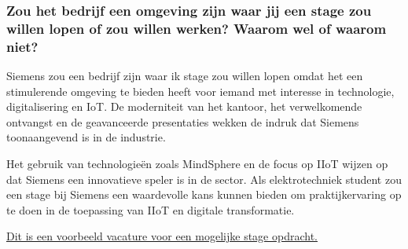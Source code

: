 \subsubsection{Zou het bedrijf een omgeving zijn waar jij een stage zou willen lopen of zou willen werken? Waarom wel of waarom niet?}

Siemens zou een bedrijf zijn waar ik stage zou willen lopen omdat het een stimulerende omgeving te bieden heeft voor iemand met interesse in technologie, digitalisering en IoT. De moderniteit van het kantoor, het verwelkomende ontvangst en de geavanceerde presentaties wekken de indruk dat Siemens toonaangevend is in de industrie.

Het gebruik van technologieën zoals MindSphere en de focus op IIoT wijzen op dat Siemens een innovatieve speler is in de sector. Als elektrotechniek student zou een stage bij Siemens een waardevolle kans kunnen bieden om praktijkervaring op te doen in de toepassing van IIoT en digitale transformatie. 

\href{https://jobs.siemens.com/careers/job/563156116443106?microsite=siemens.com}{Dit is een voorbeeld vacature voor een mogelijke stage opdracht.}